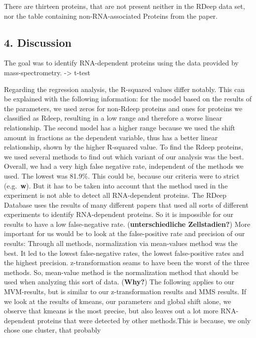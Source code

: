 \documentclass[
  12pt,
]{article}
\begin{document}
There are thirteen proteins, that are not present neither in the RDeep
data set, nor the table containing non-RNA-associated Proteins from the
paper.

\hypertarget{discussion}{%
\subsection{4. Discussion}\label{discussion}}

The goal was to identify RNA-dependent proteins using the data provided
by mass-spectrometry. -\textgreater{} t-test

Regarding the regression analysis, the R-squared values differ notably.
This can be explained with the following information: for the model
based on the results of the parameters, we used zeros for non-Rdeep
proteins and ones for proteins we classified as Rdeep, resulting in a
low range and therefore a worse linear relationship. The second model
has a higher range because we used the shift amount in fractions as the
dependent variable, thus has a better linear relationship, shown by the
higher R-squared value. To find the Rdeep proteins, we used several
methods to find out which variant of our analysis was the best. Overall,
we had a very high false negative rate, independent of the methods we
used. The lowest was 81.9\%. This could be, because our criteria were to
strict (e.g.~\textbf{w}). But it has to be taken into account that the
method used in the experiment is not able to detect all RNA-dependent
proteins. The RDeep Database uses the results of many different papers
that used all sorts of different experiments to identify RNA-dependent
proteins. So it is impossible for our results to have a low
false-negative rate. (\textbf{unterschiedliche Zellstadien?}) More
important for us would be to look at the false-positive rate and
precision of our results: Through all methods, normalization via
mean-values method was the best. It led to the lowest false-negative
rates, the lowest false-positive rates and the highest precision.
z-transformation seams to have been the worst of the three methods. So,
mean-value method is the normalization method that should be used when
analyzing this sort of data. (\textbf{Why?}) The following applies to
our MVM-results, but is similar to our z-transformation results and MMS
results. If we look at the results of kmeans, our parameters and global
shift alone, we observe that kmeans is the most precise, but also leaves
out a lot more RNA-dependent proteins that were detected by other
methods.This is because, we only chose one cluster, that probably
\end{document}
